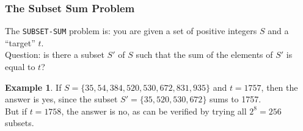 \documentclass[12pt]{article}
\theoremstyle{plain}
\theoremstyle{definition}
\newtheorem*{ex*}{Example}
\begin{document}
\subsubsection{The Subset Sum Problem}
The \texttt{SUBSET-SUM} problem is: you are given a set of positive integers $S$ and a ``target'' $t$. \\
Question: is there a subset $S'$ of $S$ such that the sum of the elements of $S'$ is equal to $t$?

\begin{ex*}
If $S = \{35, 54, 384, 520, 530, 672, 831, 935\}$ and $t = 1757$, then the answer is yes, since the subset $S' = \{35, 520, 530, 672\}$ sums to 1757. \\
But if $t = 1758$, the answer is no, as can be verified by trying all $2^{8} = 256$ subsets.
\end{ex*}
\end{document}
